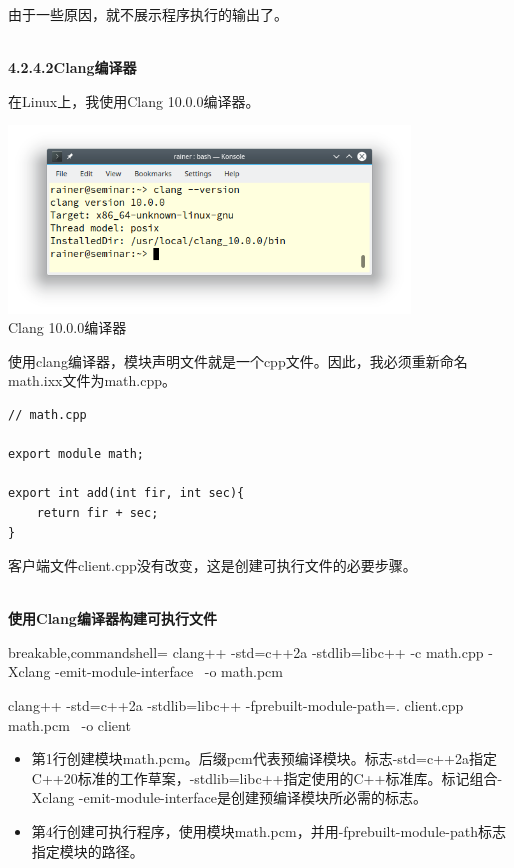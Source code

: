 由于一些原因，就不展示程序执行的输出了。

\hspace*{\fill} \\ %
\noindent
\textbf{4.2.4.2\hspace{0.2cm}Clang编译器}

在Linux上，我使用Clang 10.0.0编译器。

\begin{center}
\includegraphics[width=0.8\textwidth]{content/3/chapter4/images/19.png}\\
Clang 10.0.0编译器
\end{center}

使用clang编译器，模块声明文件就是一个cpp文件。因此，我必须重新命名math.ixx文件为math.cpp。

\begin{lstlisting}[style=styleCXX]
// math.cpp

export module math;

export int add(int fir, int sec){
	return fir + sec;
}
\end{lstlisting}

客户端文件client.cpp没有改变，这是创建可执行文件的必要步骤。

\hspace*{\fill} \\ %
\noindent
\textbf{使用Clang编译器构建可执行文件}
\begin{tcblisting}{breakable,commandshell={}}
clang++ -std=c++2a -stdlib=libc++ -c math.cpp -Xclang -emit-module-interface \
   -o math.pcm

clang++ -std=c++2a -stdlib=libc++ -fprebuilt-module-path=. client.cpp math.pcm \
   -o client
\end{tcblisting}

\begin{itemize}
\item 
第1行创建模块math.pcm。后缀pcm代表预编译模块。标志-std=c++2a指定C++20标准的工作草案，-stdlib=libc++指定使用的C++标准库。标记组合-Xclang -emit-module-interface是创建预编译模块所必需的标志。

\item 
第4行创建可执行程序，使用模块math.pcm，并用-fprebuilt-module-path标志指定模块的路径。
\end{itemize}

